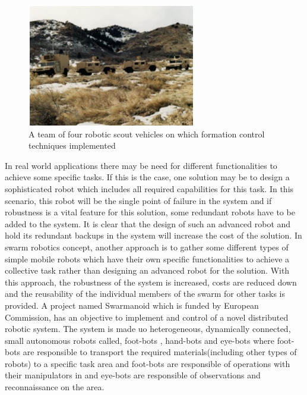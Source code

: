 \documentclass[twoside]{article}
\begin{document}
	\begin{figure}[H]
		\caption{A team of four robotic scout vehicles on which formation control techniques implemented}
		\centering
		\includegraphics[scale = 1]{scout_robots}
	\end{figure} 

In real world applications there may be need for different  functionalities to achieve some specific tasks. If this is the case, one solution may be to design a sophisticated robot which includes all required capabilities for this task. In this scenario, this robot will be the single point of failure in the system and if robustness is a  vital feature for this solution, some redundant robots have to be added to the system. It is clear that the design of such an advanced robot and hold its redundant backups in the system will increase the cost of the solution. In swarm robotics concept, another approach is to gather some different types of simple mobile robots which have their own specific functionalities to achieve a collective task rather than designing an advanced robot for the solution. With this approach, the robustness of the system is increased, costs are reduced down and the reusability of the individual members of the swarm for other tasks is provided.  A project named Swarmanoid which is funded by European Commission, has an objective to implement and control of a novel distributed robotic system. The system is made uo heterogeneous, dynamically connected, small autonomous robots called,  foot-bots , hand-bots and eye-bots where foot-bots are responsible to transport the required materials(including other types of robots) to a specific task area and foot-bots are responsible of operations with their manipulators in and eye-bots are responsible of observations and reconnaissance on the area.
\end{document}
